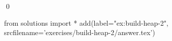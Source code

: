 
\begin{ex} 
  \label{ex:build-heap-2}
  
  \qed
\end{ex} 
\begin{python0}
from solutions import *
add(label="ex:build-heap-2",
    srcfilename='exercises/build-heap-2/answer.tex') 
\end{python0}
